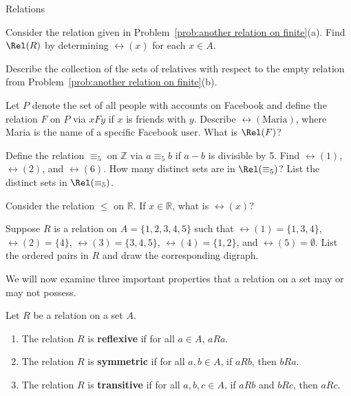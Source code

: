 \begin{section}{Relations}
\begin{problem}
Consider the relation given in Problem~\ref{prob:another relation on finite}(a).  Find $\Rel(R)$ by determining $\rel(x)$ for each $x\in A$.
\end{problem}

\begin{problem}
Describe the collection of the sets of relatives with respect to the empty relation from Problem~\ref{prob:another relation on finite}(b).
\end{problem}

\begin{problem}\label{prob:facebook}
Let $P$ denote the set of all people with accounts on Facebook and define the relation $F$ on $P$ via $xFy$ if $x$ is friends with $y$. Describe $\rel(\text{Maria})$, where Maria is the name of a specific Facebook user.  What is $\Rel(F)$?
\end{problem}

\begin{problem}\label{prob:mod 5}
Define the relation $\equiv_5$ on $\mathbb{Z}$ via $a\equiv_5 b$ if $a-b$ is divisible by 5. Find $\rel(1)$, $\rel(2)$, and $\rel(6)$.  How many distinct sets are in $\Rel(\equiv_5)$? List the distinct sets in $\Rel(\equiv_5)$.
\end{problem}

\begin{problem}
Consider the relation $\leq$ on $\mathbb{R}$.  If $x\in \mathbb{R}$, what is $\rel(x)$?
\end{problem}

\begin{problem}\label{prob:find sim from Rel}
Suppose $R$ is a relation on $A=\{1,2,3,4,5\}$ such that $\rel(1)=\{1,3,4\}$, $\rel(2)=\{4\}$, $\rel(3)=\{3,4,5\}$, $\rel(4)=\{1,2\}$, and $\rel(5)=\emptyset$. List the ordered pairs in $R$ and draw the corresponding digraph.
\end{problem}

We will now examine three important properties that a relation on a set may or may not possess.

\begin{definition}
Let $R$ be a relation on a set $A$.
\begin{enumerate}[label=\textrm{(\alph*)}]
\item The relation $R$ is \textbf{reflexive} if for all $a\in A$, $aR a$.
\item The relation $R$ is \textbf{symmetric} if for all $a,b\in A$, if $aR b$, then $bR a$.
\item The relation $R$ is \textbf{transitive} if for all $a,b,c\in A$, if $aR b$ and $bR c$, then $aR c$.
\end{enumerate}
\end{definition}


\end{section}
